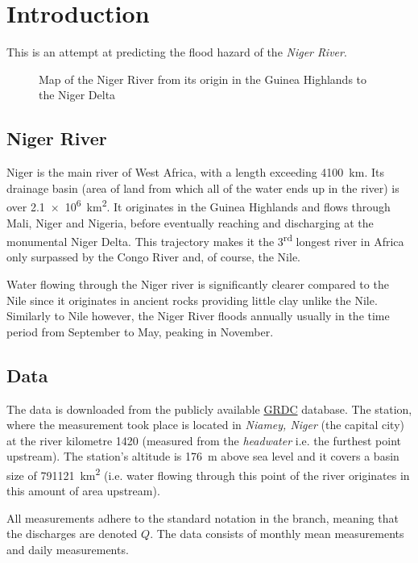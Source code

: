 \section{Introduction}%
\label{sec:introduction}
This is an attempt at predicting the flood hazard of the \emph{Niger River}.

\begin{figure}[H]
    \centering
    \caption{Map of the Niger River from its origin in the Guinea Highlands to the Niger Delta}
    \label{fig:map_of_the_river}
\end{figure}

\subsection{Niger River}%
\label{sub:niger_river}
Niger is the main river of West Africa, with a length exceeding \qty{4100}{km}. Its drainage basin (area of land from
which all of the water ends up in the river) is over \qty{2.1e6}{km^2}. It originates in the Guinea Highlands and flows 
through Mali, Niger and Nigeria, before eventually reaching and discharging at the monumental Niger Delta. This 
trajectory makes it the 3\textsuperscript{rd} longest river in Africa only surpassed by the Congo River and, of course, 
the Nile.

Water flowing through the Niger river is significantly clearer compared to the Nile since it originates in ancient 
rocks providing little clay unlike the Nile. Similarly to Nile however, the Niger River floods annually usually in the 
time period from September to May, peaking in November.

\subsection{Data}%
\label{sub:data}
The data is downloaded from the publicly available \href{https://www.bafg.de/GRDC/EN/Home/homepage_node.html}{\ac{GRDC}}
database. The station, where the measurement took place is located in \emph{Niamey, Niger} (the capital city) at the river 
kilometre \qty{1420}{} (measured from the \emph{headwater} i.e. the furthest point upstream). The station's altitude is \qty{176}{m} above sea level and it covers a basin size of
\qty{791121}{km^2} (i.e. water flowing through this point of the river originates in this amount of area
upstream).

All measurements adhere to the standard notation in the branch, meaning that the discharges are denoted \(Q\). The data
consists of monthly mean measurements and daily measurements.

